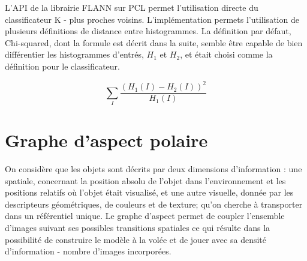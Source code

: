 L'API de la librairie FLANN sur PCL permet l'utilisation directe du classificateur
K - plus proches voisins. L'implémentation permets l'utilisation de plusieurs
définitions de distance entre histogrammes. La définition par défaut, Chi-squared,
dont la formule est décrit dans la suite, semble être capable de bien différentier
les histogrammes d'entrés, $H_1$ et $H_2$, et était choisi comme la définition pour le classificateur.

$$\sum _I \frac{\left(H_1(I)-H_2(I)\right)^2}{H_1(I)} $$






\section {Graphe d'aspect polaire}

On considère que les objets sont décrits par deux dimensions
d'information : une spatiale, concernant la position absolu de l'objet
dans l'environnement et les positions relatifs où l'objet était
visualisé, et une autre visuelle, donnée par les descripteurs
géométriques, de couleurs et de texture; qu'on cherche à transporter
dans un référentiel unique. Le graphe d'aspect permet de coupler
l'ensemble d'images suivant ses possibles transitions spatiales ce qui
résulte dans la possibilité de construire le modèle à la volée et de
jouer avec sa densité d'information - nombre d'images incorporées.

